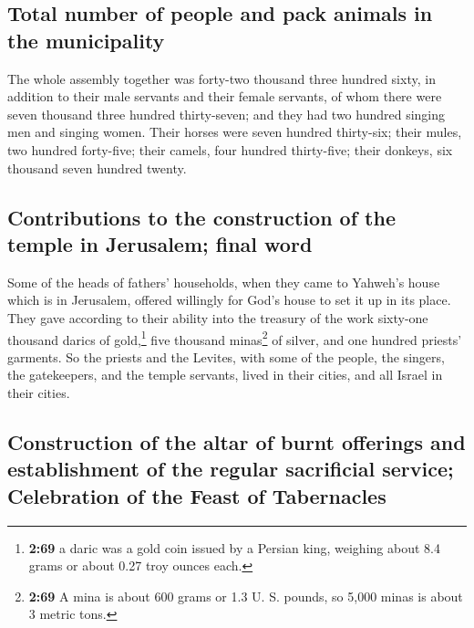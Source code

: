 \hypertarget{total-number-of-people-and-pack-animals-in-the-municipality}{%
\subsection{Total number of people and pack animals in the
municipality}\label{total-number-of-people-and-pack-animals-in-the-municipality}}

 The whole assembly together was forty-two thousand three
hundred sixty,  in addition to their male servants and
their female servants, of whom there were seven thousand three hundred
thirty-seven; and they had two hundred singing men and singing women.
 Their horses were seven hundred thirty-six; their mules,
two hundred forty-five;  their camels, four hundred
thirty-five; their donkeys, six thousand seven hundred twenty.

\hypertarget{contributions-to-the-construction-of-the-temple-in-jerusalem-final-word}{%
\subsection{Contributions to the construction of the temple in
Jerusalem; final
word}\label{contributions-to-the-construction-of-the-temple-in-jerusalem-final-word}}

 Some of the heads of fathers' households, when they came
to Yahweh's house which is in Jerusalem, offered willingly for God's
house to set it up in its place.  They gave according to
their ability into the treasury of the work sixty-one thousand darics of
gold,\footnote{\textbf{2:69} a daric was a gold coin issued by a Persian
  king, weighing about 8.4 grams or about 0.27 troy ounces each.} five
thousand minas\footnote{\textbf{2:69} A mina is about 600 grams or 1.3
  U. S. pounds, so 5,000 minas is about 3 metric tons.} of silver, and
one hundred priests' garments.  So the priests and the
Levites, with some of the people, the singers, the gatekeepers, and the
temple servants, lived in their cities, and all Israel in their cities.

\hypertarget{construction-of-the-altar-of-burnt-offerings-and-establishment-of-the-regular-sacrificial-service-celebration-of-the-feast-of-tabernacles}{%
\subsection{Construction of the altar of burnt offerings and
establishment of the regular sacrificial service; Celebration of the
Feast of
Tabernacles}\label{construction-of-the-altar-of-burnt-offerings-and-establishment-of-the-regular-sacrificial-service-celebration-of-the-feast-of-tabernacles}}

